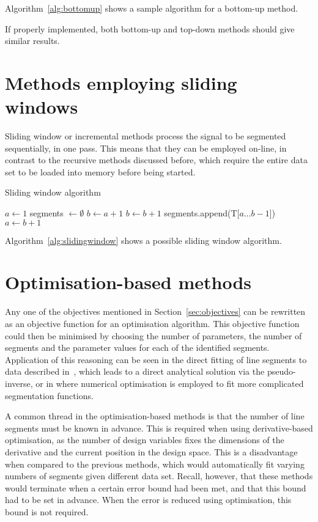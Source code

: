 Algorithm~\ref{alg:bottomup} shows a sample algorithm for a bottom-up
method.

If properly implemented, both bottom-up and top-down methods should
give similar results.

\section{Methods employing sliding windows}
Sliding window or incremental methods process the signal to be
segmented sequentially, in one pass.  This means that they can be
employed on-line, in contrast to the recursive methods discussed
before, which require the entire data set to be loaded into memory
before being started.

\begin{algorithm}
  \caption{Sliding window algorithm}
  \label{alg:slidingwindow}
  \begin{algorithmic}
    \State $a \gets 1$
    \State segments $\gets\emptyset$ 
    \State $b\gets a+1$
    \State $b \gets b + 1$
    \EndWhile
    \State segments.append(T[$a\dots b-1$])
    \State $a \gets b + 1$
    \EndWhile
    \EndFunction
  \end{algorithmic}
\end{algorithm}

Algorithm~\ref{alg:slidingwindow} shows a possible sliding window
algorithm.

\section{Optimisation-based methods}
Any one of the objectives mentioned in Section~\ref{sec:objectives}
can be rewritten as an objective function for an optimisation
algorithm.  This objective function could then be minimised by
choosing the number of parameters, the number of segments and the
parameter values for each of the identified segments.  Application of
this reasoning can be seen in the direct fitting of line segments to
data described in~\citet{cantoni1971optimal}, which leads to a direct
analytical solution via the pseudo-inverse, or in where numerical
optimisation is employed to fit more complicated segmentation
functions.

A common thread in the optimisation-based methods is that the number
of line segments must be known in advance.  This is required when
using derivative-based optimisation, as the number of design variables
fixes the dimensions of the derivative and the current position in the
design space.  This is a disadvantage when compared to the previous
methods, which would automatically fit varying numbers of segments
given different data set.  Recall, however, that these methods would
terminate when a certain error bound had been met, and that this bound
had to be set in advance.  When the error is reduced using
optimisation, this bound is not required.

